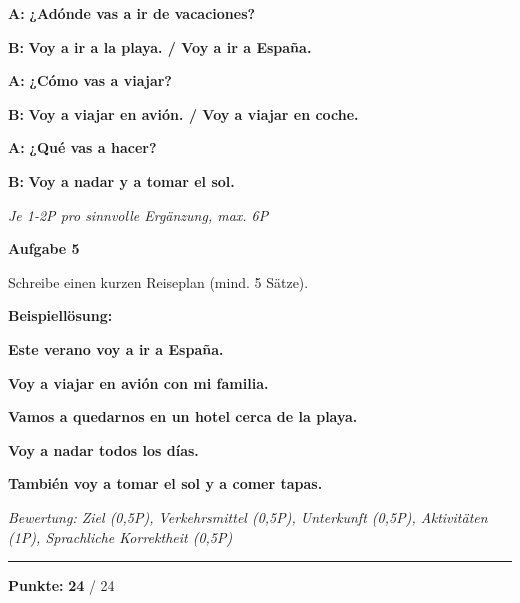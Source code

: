 \documentclass[11pt, a4paper]{article}
\newcommand{\fachfarbe}{spanisch}
\newcommand{\maxpunkte}{24}
\newcommand{\punktebox}[1]{\hfill\fbox{\small \_/#1}}
\newcommand{\loesung}[1]{\textcolor{loesung}{\textbf{#1}}}
\newcommand{\es}[1]{\textcolor{\fachfarbe}{\textbf{#1}}}
\newenvironment{aufgabe}[1]{%
    \vspace{10pt}
    \noindent\textbf{\textcolor{\fachfarbe}{Aufgabe #1}}
    \vspace{5pt}
    \begin{list}{}{\leftmargin=0pt}
    \item[]
}{%
    \end{list}
}
\begin{document}
\noindent
\textbf{A:} \es{¿Adónde vas a ir de vacaciones?}

\textbf{B:} \loesung{Voy a ir a la playa. / Voy a ir a España.}

\textbf{A:} \es{¿Cómo vas a viajar?}

\textbf{B:} \loesung{Voy a viajar en avión. / Voy a viajar en coche.}

\textbf{A:} \loesung{¿Qué vas a hacer?}

\textbf{B:} \loesung{Voy a nadar y a tomar el sol.}

\vspace{0.5em}
\textit{\textcolor{grau}{Je 1-2P pro sinnvolle Ergänzung, max. 6P}}

\vspace{15pt}


\begin{aufgabe}{5}
Schreibe einen kurzen Reiseplan (mind. 5 Sätze). \punktebox{3}
\end{aufgabe}

\textbf{Beispiellösung:}

\loesung{Este verano voy a ir a España.}

\loesung{Voy a viajar en avión con mi familia.}

\loesung{Vamos a quedarnos en un hotel cerca de la playa.}

\loesung{Voy a nadar todos los días.}

\loesung{También voy a tomar el sol y a comer tapas.}

\vspace{0.5em}
\textit{\textcolor{grau}{Bewertung: Ziel (0,5P), Verkehrsmittel (0,5P), Unterkunft (0,5P), Aktivitäten (1P), Sprachliche Korrektheit (0,5P)}}

\vspace{20pt}
\hrule
\vspace{10pt}

\begin{flushright}
\textbf{Punkte:} \loesung{\maxpunkte} / \maxpunkte
\end{flushright}
\end{document}

